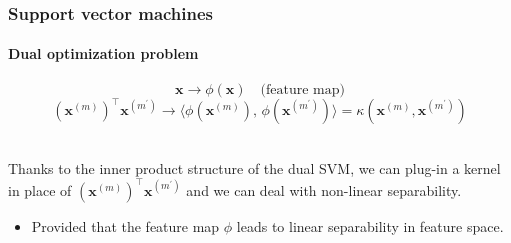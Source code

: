 \documentclass[aspectratio=43]{beamer}
\newcommand{\inner}[2]{\langle #1,\, #2\rangle}
\newcommand{\kernel}[2]{\kappa\left( #1, #2 \right)}
\begin{document}
\begin{frame}
  \frametitle{Support vector machines}
  \framesubtitle{Dual optimization problem}
  
  \[\mathbf{x} \rightarrow \phi\left( \mathbf{x} \right) \quad \text{(feature map)}\]
  \[\left( \mathbf{x}^{(m)} \right)^\top \mathbf{x}^{(m^\prime)} \rightarrow \inner{\phi\left( \mathbf{x}^{(m)} \right)}{\phi\left( \mathbf{x}^{(m^\prime)} \right)} = \kernel{\mathbf{x}^{(m)}}{\mathbf{x}^{(m^\prime)}}\]

  \ \\
  Thanks to the inner product structure of the dual SVM, we can plug-in a kernel in place of $\left( \mathbf{x}^{(m)} \right)^\top \mathbf{x}^{(m^\prime)}$ and we can deal with non-linear separability.
  \begin{itemize}
    \item Provided that the feature map $\phi$ leads to linear separability in feature space.
  \end{itemize}
  

\end{frame}





\begin{frame}[allowframebreaks,t]{\bibname}
	\AtNextBibliography{\footnotesize}%
	\printbibliography
\end{frame}
\end{document}
